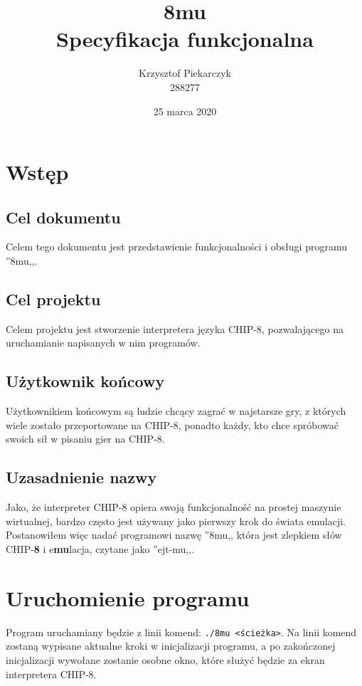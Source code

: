 \documentclass[a4paper,12pt]{report}
\title{8mu \\ \large Specyfikacja funkcjonalna}
\author{Krzysztof Piekarczyk \\ \small 288277}
\date{25 marca 2020}
\begin{document}
\maketitle

\tableofcontents
\thispagestyle{fancy}

\chapter{Wstęp}
\thispagestyle{fancy}

\section{Cel dokumentu}
Celem tego dokumentu jest przedstawienie funkcjonalności i obsługi programu ''8mu,,.

\section{Cel projektu}
Celem projektu jest stworzenie interpretera języka CHIP-8, pozwalającego na uruchamianie napisanych w nim programów.

\section{Użytkownik końcowy}
Użytkownikiem końcowym są ludzie chcący zagrać w najstarsze gry, z których wiele zostało przeportowane na CHIP-8, ponadto każdy, kto chce spróbować swoich sił w pisaniu gier na CHIP-8.

\section{Uzasadnienie nazwy}
Jako, że interpreter CHIP-8 opiera swoją funkcjonalność na prostej maszynie wirtualnej, bardzo często jest używany jako pierwszy krok do świata emulacji. Postanowiłem więc nadać programowi nazwę ''8mu,, która jest zlepkiem słów CHIP-\textbf{8} i e\textbf{mu}lacja, czytane jako ''ejt-mu,,.

\chapter{Uruchomienie programu}
\thispagestyle{fancy}
Program uruchamiany będzie z linii komend: \verb+./8mu <ścieżka>+. Na linii komend zostaną wypisane aktualne kroki w inicjalizacji programu, a po zakończonej inicjalizacji wywołane zostanie osobne okno, które służyć będzie za ekran interpretera CHIP-8.
\end{document}
